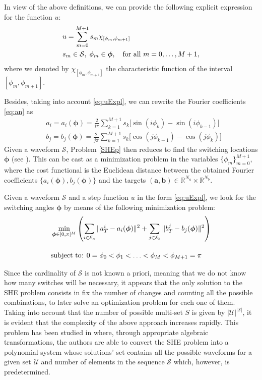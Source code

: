 In view of the above definitions, we can provide the following explicit expression for the function $u$:
\begin{align}\label{eq:uExpl}
	&u = \sum_{m=0}^{M+1} s_m\chi_{[\phi_m,\phi_{m+1}]}
	\\
	&s_m\in\mathcal S, \;\phi_m\in{\bm{\phi}}, \quad \mbox{for all } m=0,\ldots,M+1, \notag 
\end{align}
where we denoted by $\chi_{[\phi_m,\phi_{m+1}]}$ the characteristic function of the interval $[\phi_m,\phi_{m+1}]$.

Besides, taking into account \eqref{eq:uExpl}, we can rewrite the Fourier coefficients \eqref{eq:an} as
\begin{align*}
	& a_i = a_i(\bm{\phi}) =  \frac{2}{i\pi} \sum_{k=1}^{M+1} s_k \Big[\sin(i\phi_k) -\sin(i\phi_{k-1})\Big]
	\\
	& b_j = b_j(\bm{\phi}) = \frac{2}{j\pi} \sum_{k=1}^{M+1} s_k \Big[\cos(j\phi_{k-1}) -\cos(j\phi_{k})\Big]
\end{align*}
Given a waveform $\mathcal S$, Problem \ref{SHEp} then reduces to find the switching locations $\bm{\phi}$ (see \cite{Yang2015,Konstantinou2010,Sun1996}). This can be cast as a minimization problem in the variables $\{\phi_m\}_{m=0}^{M+1}$, where the cost functional is the Euclidean distance between the obtained Fourier coefficients $\{a_i(\bm{\phi}),b_j(\bm{\phi})\}$ and the targets $(\bm{a},\bm{b})\in \mathbb{R}^{N_a}\times \mathbb{R}^{N_b}$.
\newline
\begin{problem}
Given a waveform $\mathcal S$ and a step function $u$ in the form \eqref{eq:uExpl}, we look for the switching angles $\bm{\phi}$ by means of the following minimization problem:
\begin{align}
	&\min_{\bm{\phi} \in [0,\pi]^{M}} \left(\sum_{i\in\mathcal{E}_a} \|a_T^i - a_i(\bm{\phi})\|^2 + \sum_{j\in \mathcal{E}_b} \|b_T^j - b_j(\bm{\phi})\|^2\right)\notag 
	\\[10pt]
	&\mbox{subject to: } 0 = \phi_0 <\phi_1 < \ldots < \phi_{M} < \phi_{M+1} = \pi \notag 
	\\
\end{align}
\end{problem}






Since the cardinality of $\mathcal S$ is not known a priori, meaning that we do not know how many switches will be necessary, it appears that the only solution to the SHE problem consists in fix the number of changes and counting all the possible combinations, to later solve an optimization problem for each one of them.
%
Taking into account that the number of possible multi-set $S$ is given by $|\mathcal{U}|^{|\mathcal S|}$, it is evident that the complexity of the above approach increases rapidly.
%
This problem has been studied in \cite{Yang2015} where, through appropriate algebraic transformations, the authors are able to convert the SHE problem into a polynomial system whose solutions' set contains all the possible waveforms for a given set $\mathcal{U}$ and number of elements in the sequence $\mathcal S$ which, however, is predetermined. 
%

